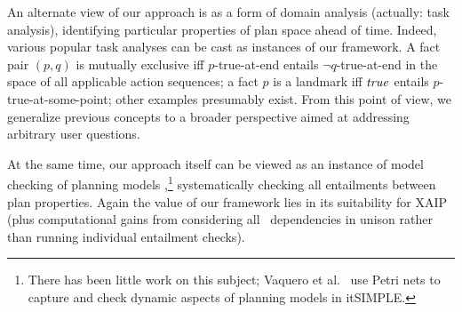 %
An alternate view of our approach is as a form of domain analysis
(actually: task analysis), identifying particular properties of plan
space ahead of time. Indeed, various popular task analyses can be cast
as instances of our framework. A fact pair $(p,q)$ is mutually
exclusive \cite{blum:furst:ai-97} iff $p$-true-at-end entails $\neg
q$-true-at-end in the space of all applicable action sequences; a fact
$p$ is a landmark \cite{hoffmann:etal:jair-04} iff $\mathit{true}$ entails
$p$-true-at-some-point; other examples presumably exist. From this
point of view, we generalize previous concepts to a broader
perspective aimed at addressing arbitrary user questions. 

At the same time, our approach itself can be viewed as an instance of
model checking of planning models
\cite{clarke:etal:01},\footnote{There has been little work on this
  subject; Vaquero et al.\  use Petri
  nets to capture and check dynamic aspects of planning models in
  itSIMPLE.}  systematically checking all entailments between plan
properties. Again the value of our framework lies in its suitability
for XAIP (plus computational gains from considering all
\props\ dependencies in unison rather than running individual
entailment checks).


